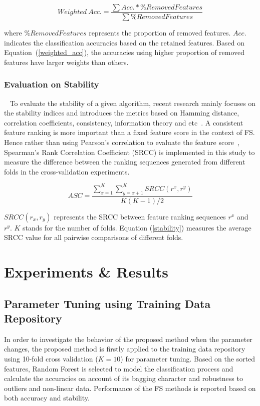 \documentclass[conference]{IEEEtran}
\begin{document}
\begin{equation}\label{weighted_acc}
	Weighted \ Acc. =\frac{\sum Acc. * \% RemovedFeatures}{\sum \%RemovedFeatures}
\end{equation}

\noindent
where $\% RemovedFeatures$ represents the proportion of removed features. $Acc.$ indicates the classification accuracies based on the retained features. Based on Equation~(\ref{weighted_acc}), the accuracies using higher proportion of removed features have larger weights than others. 

\subsubsection{\textbf{Evaluation on Stability}}~\label{eval_sta}
To evaluate the stability of a given algorithm, recent research mainly focuses on the stability indices and introduces the metrics based on Hamming distance, correlation coefficients, consistency, information theory and etc~\cite{khaire2019stability}. A consistent feature ranking is more important than a fixed feature score in the context of FS. Hence rather than using Pearson's correlation to evaluate the feature score~\cite{shen2019novel}, Spearman's Rank Correlation Coefficient (SRCC) is implemented in this study to measure the difference between the ranking sequences generated from different folds in the cross-validation experiments.

\begin{equation}\label{stability}
	ASC = \frac{\sum_{x = 1}^{K} \sum_{y = x +1}^{K} SRCC(r^x, r^y)}{K(K-1)/2}
\end{equation}

\noindent
$SRCC(r_x, r_y)$ represents the SRCC between feature ranking sequences $r^x$ and $r^y$. $K$ stands for the number of folds. Equation (\ref{stability}) measures the average SRCC value for all pairwise comparisons of different folds.


\section{Experiments \& Results}
\subsection{Parameter Tuning using Training Data Repository}
In order to investigate the behavior of the proposed method when the parameter changes, the proposed method is firstly applied to the training data repository using 10-fold cross validation ($K=10$) for parameter tuning. Based on the sorted features, Random Forest is selected to model the classification process and calculate the accuracies on account of its bagging character and robustness to outliers and non-linear data. Performance of the FS methods is reported based on both accuracy and stability.
\end{document}

